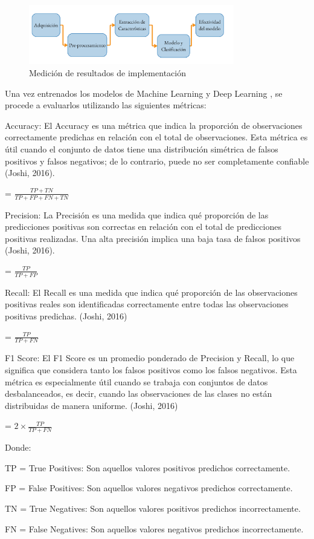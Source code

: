 \begin{figure}[H]
	\begin{center}
		\includegraphics[width=0.8\textwidth]{3/figures/meto2.jpg}
		\caption{Medición de resultados de implementación}
		\label{}
	\end{center}
\end{figure}

Una vez entrenados los modelos de Machine Learning y Deep Learning , se procede a evaluarlos utilizando las siguientes métricas:

Accuracy:
El Accuracy es una métrica que indica la proporción de observaciones correctamente predichas en relación con el total de observaciones. Esta métrica es útil cuando el conjunto de datos tiene una distribución simétrica de falsos positivos y falsos negativos; de lo contrario, puede no ser completamente confiable (Joshi, 2016).

 = \(\frac{TP + TN}{TP + FP + FN + TN}\)

Precision:
La Precisión es una medida que indica qué proporción de las predicciones positivas son correctas en relación con el total de predicciones positivas realizadas. Una alta precisión implica una baja tasa de falsos positivos (Joshi, 2016).

 = \(\frac{TP}{TP + FP}\)


Recall:
El Recall es una medida que indica qué proporción de las observaciones positivas reales son identificadas correctamente entre todas las observaciones positivas predichas. (Joshi, 2016)

 = \(\frac{TP}{TP + FN}\)

F1 Score:
El F1 Score es un promedio ponderado de Precision y Recall, lo que significa que considera tanto los falsos positivos como los falsos negativos. Esta métrica es especialmente útil cuando se trabaja con conjuntos de datos desbalanceados, es decir, cuando las observaciones de las clases no están distribuidas de manera uniforme. (Joshi, 2016)

 = \(2 \times \frac{TP}{TP + FN}\)

Donde:

TP = True Positives: Son aquellos valores positivos predichos correctamente.

FP = False Positives: Son aquellos valores negativos predichos correctamente.

TN = True Negatives: Son aquellos valores positivos predichos incorrectamente.

FN = False Negatives: Son aquellos valores negativos predichos incorrectamente.
